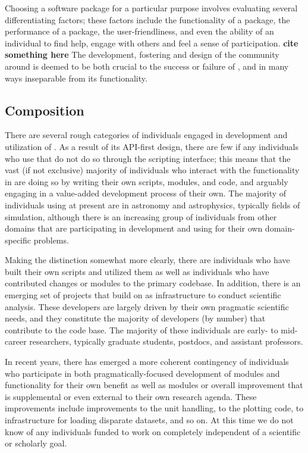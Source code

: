 %

Choosing a software package for a particular purpose involves evaluating
several differentiating factors; these factors include the functionality of a
package, the performance of a package, the user-friendliness, and even the
ability of an individual to find help, engage with others and feel a sense of
participation.  \textbf{cite something here} The development, fostering and
design of the community around \yt{} is deemed to be both crucial to the
success or failure of \yt{}, and in many ways inseparable from its
functionality.

\subsection{Composition}

There are several rough categories of individuals engaged in development and
utilization of \yt{}.  As a result of its API-first design, there are few if
any individuals who use \yt{} that do not do so through the scripting
interface; this means that the vast (if not exclusive) majority of individuals
who interact with the functionality in \yt{} are doing so by writing their own
scripts, modules, and code, and arguably engaging in a value-added development
process of their own.  The majority of individuals using \yt{} at present are
in astronomy and astrophysics, typically fields of simulation, although there
is an increasing group of individuals from other domains that are participating
in development and using \yt{} for their own domain-specific problems.

Making the distinction somewhat more clearly, there are individuals who have
built their own scripts and utilized them as well as individuals who have
contributed changes or modules to the primary \yt{} codebase.  In addition,
there is an emerging set of projects that build on \yt{} as infrastructure to
conduct scientific analysis.  These developers are largely driven by their own
pragmatic scientific needs, and they constitute the majority of developers (by
number) that contribute to the code base.  The majority of these individuals
are early- to mid-career researchers, typically graduate students, postdocs,
and assistant professors.

In recent years, there has emerged a more coherent contingency of individuals
who participate in both pragmatically-focused development of modules and
functionality for their own benefit as well as modules or overall improvement
that is supplemental or even external to their own research agenda.  These
improvements include improvements to the unit handling, to the plotting code,
to infrastructure for loading disparate datasets, and so on.  At this time we
do not know of any individuals funded to work on \yt{} completely independent
of a scientific or scholarly goal.

